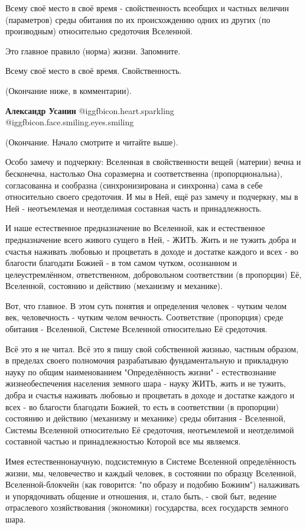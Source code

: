 \begin{itemize}
Всему своё место в своё время - свойственность всеобщих и частных величин
(параметров) среды обитания по их происхождению одних из других (по
производным) относительно средоточия Вселенной.

Это главное правило (норма) жизни. Запомните.

Всему своё место в своё время. Свойственность.

(Окончание ниже, в комментарии).

\begin{itemize} %
\textbf{Александр Усанин}  @igg{fbicon.heart.sparkling}  @igg{fbicon.face.smiling.eyes.smiling} 

(Окончание. Начало смотрите и читайте выше).

Особо замечу и подчеркну: Вселенная в свойственности вещей (материи) вечна и
бесконечна, настолько Она соразмерна и соответственна (пропорциональна),
согласованна и сообразна (синхронизирована и синхронна) сама в себе
относительно своего средоточия. И мы в Ней, ещё раз замечу и подчеркну, мы в
Ней - неотъемлемая и неотделимая составная часть и принадлежность.

И наше естественное предназначение во Вселенной, как и естественное
предназначение всего живого сущего в Ней, - ЖИТЬ. Жить и не тужить добра и
счастья наживать любовью и процветать в доходе и достатке каждого и всех - во
благости благодати Божией - в том самом чутком, осознанном и целеустремлённом,
ответственном, добровольном соответствии (в пропорции) Её, Вселенной, состоянию
и действию (механизму и механике).

Вот, что главное. В этом суть понятия и определения человек - чутким челом век,
человечность - чутким челом вечность. Соответствие (пропорция) среде обитания -
Вселенной, Системе Вселенной относительно Её средоточия.

Всё это я не читал. Всё это я пишу свой собственной жизнью, частным образом, в
пределах своего полномочия разрабатываю фундаментальную и прикладную науку по
общим наименованием "Определённость жизни" - естествознание жизнеобеспечения
населения земного шара - науку ЖИТЬ, жить и не тужить, добра и счастья наживать
любовью и процветать в доходе и достатке каждого и всех - во благости благодати
Божией, то есть в соответствии (в пропорции) состоянию и действию (механизму и
механике) среды обитания - Вселенной, Системы Вселенной относительно Её
средоточия, неотъемлемой и неотделимой составной частью и принадлежностью
Которой все мы являемся.

Имея естественнонаучную, подсистемную в Системе Вселенной определённость жизни,
мы, человечество и каждый человек, в состоянии по образцу Вселенной,
Вселенной-блокчейн (как говорится: "по образу и подобию Божиим") налаживать и
упорядочивать общение и отношения, и, стало быть, - свой быт, ведение
отраслевого хозяйствования (экономики) государства, всех государств земного
шара.


\end{itemize}
\end{itemize}
